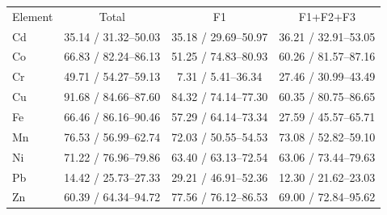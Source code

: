 \begin{tabular}{lccc}
Element & Total & F1 & F1+F2+F3\\
Cd & 35.14 / 31.32--50.03 & 35.18 / 29.69--50.97 & 36.21 / 32.91--53.05\\
Co & 66.83 / 82.24--86.13 & 51.25 / 74.83--80.93 & 60.26 / 81.57--87.16\\
Cr & 49.71 / 54.27--59.13 & 7.31 / 5.41--36.34 & 27.46 / 30.99--43.49\\
Cu & 91.68 / 84.66--87.60 & 84.32 / 74.14--77.30 & 60.35 / 80.75--86.65\\
Fe & 66.46 / 86.16--90.46 & 57.29 / 64.14--73.34 & 27.59 / 45.57--65.71\\
Mn & 76.53 / 56.99--62.74 & 72.03 / 50.55--54.53 & 73.08 / 52.82--59.10\\
Ni & 71.22 / 76.96--79.86 & 63.40 / 63.13--72.54 & 63.06 / 73.44--79.63\\
Pb & 14.42 / 25.73--27.33 & 29.21 / 46.91--52.36 & 12.30 / 21.62--23.03\\
Zn & 60.39 / 64.34--94.72 & 77.56 / 76.12--86.53 & 69.00 / 72.84--95.62\\
\end{tabular}
